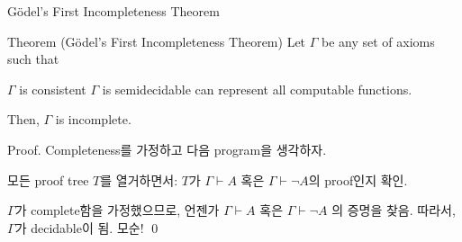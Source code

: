 \documentclass[../231120_msquare_computational-logic.tex]{subfiles}
\begin{document}
\begin{frame}{Gödel's First Incompleteness Theorem}
    \begin{block}{Theorem (Gödel's First Incompleteness Theorem)}
        Let \(\Gamma\) be any set of axioms such that
        \begin{itemize}
            \ii \(\Gamma\) is consistent
            \ii \(\Gamma\) is semidecidable
            \ii can represent all computable functions.
        \end{itemize}
        Then, \(\Gamma\) is incomplete.
    \end{block}
    \begin{block}{Proof.}
        Completeness를 가정하고 다음 program을 생각하자.
        \begin{itemize}
            \ii 모든 proof tree \(T\)를 열거하면서:
            \ii \(T\)가 \(\Gamma \vdash A\) 혹은 \(\Gamma \vdash \lnot A\)의 proof인지 확인.
        \end{itemize}
        \(\Gamma\)가 complete함을 가정했으므로,
        언젠가 \(\Gamma \vdash A\) 혹은 \(\Gamma \vdash \lnot A\) 의 증명을 찾음.
        따라서, \(\Gamma\)가 decidable이 됨. 모순! \qed
    \end{block}
\end{frame}
\end{document}
